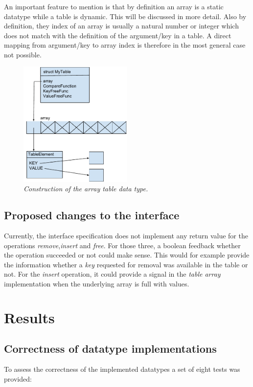 \documentclass[a4paper,11pt,twoside]{article}
\begin{document}
An important feature to mention is that by definition an array is a 
static datatype while a table is dynamic. This will be discussed in 
more detail. Also by definition, they index of an array is usually a 
natural number or integer which does not match with the definition of 
the argument/key in a table. A direct mapping from argument/key to 
array index is therefore in the most general case not possible. 


\begin{figure}[H]
\centering
\includegraphics[width=0.5\textwidth]{figures/arraytable.pdf}
\caption{\textit{Construction of the array table data type.}}
\label{fig:arraytable}
\end{figure}

\subsection{Proposed changes to the interface}
Currently, the interface specification does not implement any 
return value for the operations \emph{remove},\emph{insert} and 
\emph{free}. For
those three, a boolean feedback whether the operation succeeded or not
could make sense. This would for example provide the information
whether a \emph{key} requested for removal was available in the table or
not. For the \emph{insert} operation, it could provide a signal in the
\emph{table array} implementation when the underlying array is full with
values. 


\section{Results}
\subsection{Correctness of datatype implementations}
To assess the correctness of the implemented datatypes a set of eight
tests was provided:
\end{document}
